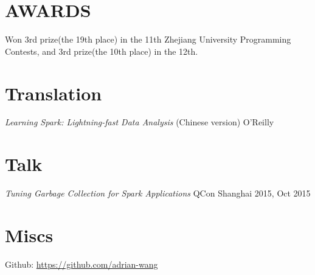 \documentclass[line,margin]{res}
\begin{document}
\begin{resume}
\section{AWARDS}
            Won 3rd prize(the 19th place) in the 11th Zhejiang University Programming Contests, and 3rd prize(the 10th place) in the 12th.

\section{Translation}
            {\sl Learning Spark: Lightning-fast Data Analysis} (Chinese version) \hfill O'Reilly

\section{Talk}
            {\sl Tuning Garbage Collection for Spark Applications} \hfill QCon Shanghai 2015, Oct 2015\\

\section{Miscs}
            Github: \href{https://github.com/adrian-wang}{https://github.com/adrian-wang}
\end{resume}
\end{document}
